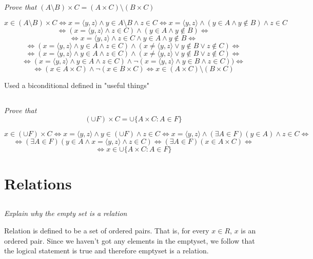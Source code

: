 \documentclass[11pt,oneside,titlepage]{book}
\DeclareMathOperator \lra {\Leftrightarrow}
\newcommand{\eangle}[1]{\langle #1 \rangle}
\begin{document}
\subsection{}

\textit{Prove that $(A \setminus B) \times C = (A \times C) \setminus (B \times C)$}

$$x \in (A \setminus B) \times C \lra x = \eangle{y, z} \land y \in A \setminus B \land z \in C
\lra  x = \eangle{y, z} \land (y \in A \land y \notin  B) \land z \in C $$
$$ \lra  (x = \eangle{y, z} \land z \in C ) \land (y \in A \land y \notin  B) \lra $$
$$ \lra  x = \eangle{y, z} \land z \in C \land y \in A \land y \notin  B \lra $$
$$ \lra  (x = \eangle{y, z} \land y \in A \land z \in C) \land
 (x \neq \eangle{y, z} \lor y \notin B \lor z \notin C)  \lra $$
$$ \lra  (x = \eangle{y, z} \land y \in A \land z \in C) \land
 (x \neq \eangle{y, z} \lor y \notin B \lor z \notin C)  \lra $$
$$ \lra  (x = \eangle{y, z} \land y \in A \land z \in C) \land
\neg (x = \eangle{y, z} \land y \in B \land z \in C))  \lra $$
$$\lra 
(x \in A \times C) \land \neg (x \in B \times C) \lra x \in (A \times C) \setminus (B \times C)$$

Used a biconditional defined in "useful things"


\subsection{}

\textit{Prove that $$(\cup F) \times C = \cup\{A \times C: A \in F\}$$}

$$x \in (\cup F) \times C \lra x = \eangle{y, z} \land y \in (\cup F) \land z \in C \lra
x = \eangle{y, z} \land (\exists A \in F)(y \in A) \land z \in C \lra
$$
$$ \lra   (\exists A \in F)(y \in A \land x = \eangle{y, z} \land z \in C) \lra
(\exists A \in F)(x \in A \times C) \lra$$
$$\lra x \in  \cup\{A \times C: A \in F\}$$

\section{Relations}

\subsection{}

\textit{Explain why the empty set is a relation}

Relation is defined to be a set of ordered pairs. That is, for every $x \in R$, $x$ is an ordered pair.
Since we haven't got any elements in the emptyset, we follow that the logical statement is true and  therefore
emptyset is a relation.
\end{document}
